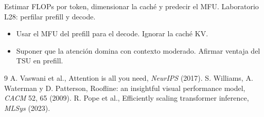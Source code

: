 \documentclass[11pt,a4paper]{article}
\begin{document}
\begin{aplicacion}
Estimar FLOPs por token, dimensionar la caché y predecir el MFU. Laboratorio L28: perfilar prefill y decode.
\end{aplicacion}

\begin{error}
\begin{itemize}[nosep]
\item Usar el MFU del prefill para el decode. \quad Ignorar la caché KV.
\item Suponer que la atención domina con contexto moderado. \quad Afirmar ventaja del TSU en prefill.
\end{itemize}
\end{error}

\begin{thebibliography}{9}\small
{} A. Vaswani et al., Attention is all you need, \emph{NeurIPS} (2017).
 S. Williams, A. Waterman y D. Patterson, Roofline: an insightful visual performance model, \emph{CACM} 52, 65 (2009).
 R. Pope et al., Efficiently scaling transformer inference, \emph{MLSys} (2023).
\end{thebibliography}
\end{document}
